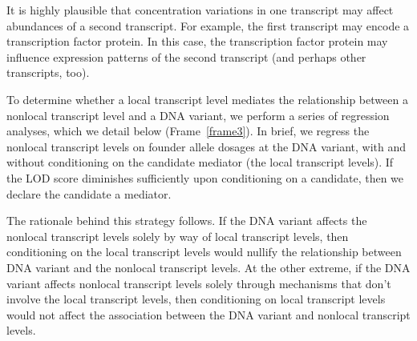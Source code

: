 \documentclass[oneside]{book}\usepackage[]{graphicx}\usepackage[]{color}
\begin{document}
It is highly plausible that concentration variations in one transcript may 
affect abundances of a second transcript. 
For example, the first transcript may encode a transcription factor protein. 
In this case, the transcription factor protein may influence expression 
patterns of the second transcript (and perhaps other transcripts, too). 


To determine whether a local transcript level mediates the relationship between 
a nonlocal transcript level and a DNA variant, we perform a series of regression analyses, 
which we detail below (Frame~\ref{frame3}). 
In brief, we regress the nonlocal transcript levels on founder allele dosages at the DNA 
variant, with and without conditioning on the candidate mediator (the local transcript levels). 
If the LOD score diminishes sufficiently upon conditioning on a candidate, 
then we declare the candidate a mediator.

The rationale behind this strategy follows. 
If the DNA variant affects the nonlocal transcript levels solely by way of local 
transcript levels, then conditioning on the local transcript levels would nullify the relationship between DNA variant and the nonlocal transcript levels. 
At the other extreme, if the DNA variant affects nonlocal transcript levels solely 
through mechanisms that don't involve the local transcript levels, then conditioning 
on local transcript levels would not affect the association between the DNA variant and nonlocal transcript levels.


\end{document}
